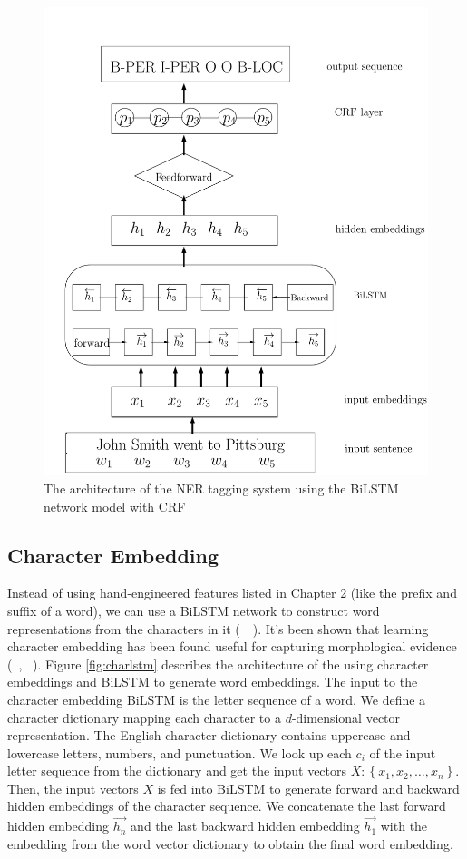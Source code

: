 \documentclass{sfuthesis}
\begin{document}
\begin{figure}
  \centering
  \includegraphics[scale=0.5]{bilstmcrf.pdf}
 \caption{The architecture of the NER tagging system using the BiLSTM network model with CRF}
  \label{fig:bilstmcrf}
\end{figure}

\subsection{Character Embedding}

Instead of using hand-engineered features listed in Chapter 2 (like the prefix and suffix of a word), we can use a BiLSTM network to construct word representations from the characters in it (~\citeauthor{lample2016neural}~\citeyear{lample2016neural}). It's been shown that learning character embedding has been found useful for capturing morphological evidence (~\citeauthor{ling2015finding}, ~\citeyear{ling2015finding}). Figure \ref{fig:charlstm} describes the architecture of the using character embeddings and BiLSTM to generate word embeddings. The input to the character embedding BiLSTM is the letter sequence of a word. We define a character dictionary mapping each character to a $d$-dimensional vector representation. The English character dictionary contains uppercase and lowercase letters, numbers, and punctuation. We look up each $c_{i}$ of the input letter sequence from the dictionary and get the input vectors $X:\left\{x_{1},x_{2},\dots,x_{n}\right\}$. Then, the input vectors $X$ is fed into BiLSTM to generate forward and backward hidden embeddings of the character sequence. We concatenate the last forward hidden embedding $\overrightarrow {h_{n}}$ and the last backward hidden embedding $\overrightarrow {h_{1}}$ with the embedding from the word vector dictionary to obtain the final word embedding.
\end{document}
